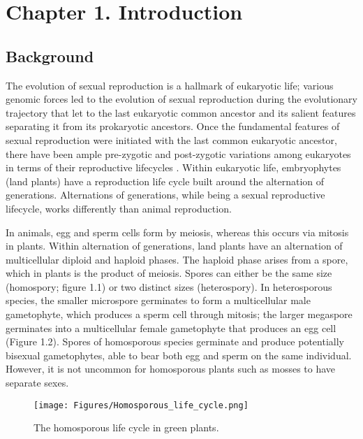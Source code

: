 
\chapter{Chapter 1. Introduction}%

\section{Background}

The evolution of sexual reproduction is a hallmark of eukaryotic life; various genomic forces led to the evolution of sexual reproduction during the evolutionary trajectory that let to the last eukaryotic common ancestor and its salient features separating it from its prokaryotic ancestors. Once the fundamental features of sexual reproduction were initiated with the last common eukaryotic ancestor, there have been ample pre-zygotic and post-zygotic variations among eukaryotes in terms of their reproductive lifecycles \cite{Goodenough2014-ql}. Within eukaryotic life, embryophytes (land plants) have a reproduction life cycle built around the alternation of generations. Alternations of generations, while being a sexual reproductive lifecycle, works differently than animal reproduction.

In animals, egg and sperm cells form by meiosis, whereas this occurs via mitosis in plants. Within alternation of generations, land plants have an alternation of multicellular diploid and haploid phases. The haploid phase arises from a spore, which in plants is the product of meiosis. Spores can either be the same size (homospory; figure 1.1) or two distinct sizes (heterospory). In heterosporous species, the smaller microspore germinates to form a multicellular male gametophyte, which produces a sperm cell through mitosis; the larger megaspore germinates into a multicellular female gametophyte that produces an egg cell (Figure 1.2). Spores of homosporous species germinate and produce potentially bisexual gametophytes, able to bear both egg and sperm on the same individual. However, it is not uncommon for homosporous plants such as mosses to have separate sexes.

\begin{figure}[ht]
    \centering
    \texttt{[image: Figures/Homosporous\_life\_cycle.png]}
    \caption[The homosporous life cycle in green plants.]{The homosporous life cycle in green plants.}
    \label{fig 1.1}
\end{figure}

